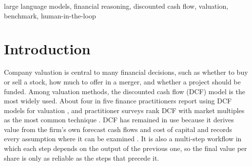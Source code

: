 \documentclass[conference]{IEEEtran}
\begin{document}
\begin{IEEEkeywords}
large language models, financial reasoning, discounted cash flow, valuation, benchmark, human-in-the-loop
\end{IEEEkeywords}


\section{Introduction}\label{sec:intro}
Company valuation is central to many financial decisions, such as whether to buy or sell a stock, how much to offer in a merger, and whether a project should be funded. Among valuation methods, the discounted cash flow (DCF) model is the most widely used. About four in five finance practitioners report using DCF models for valuation \cite{b1}, and practitioner surveys rank DCF with market multiples as the most common technique \cite{b2}. DCF has remained in use because it derives value from the firm's own forecast cash flows and cost of capital and records every assumption where it can be examined \cite{b3}. It is also a multi-step workflow in which each step depends on the output of the previous one, so the final value per share is only as reliable as the steps that precede it.
\end{document}
